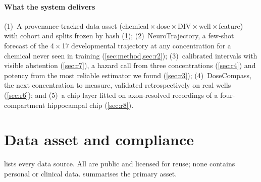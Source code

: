 \documentclass[11pt,a4paper]{article}
\newcommand{\NT}{NeuroTrajectory}
\newcommand{\DC}{DoseCompass}
\begin{document}
\paragraph{What the system delivers}
(1)~A provenance-tracked data asset (chemical\,\(\times\)\,dose\,\(\times\)\,DIV\,\(\times\)\,well\,\(\times\)\,feature)
with cohort and splits frozen by hash (\cref{sec:data}); (2)~\NT, a few-shot forecast of the 4\,\(\times\)\,17
developmental trajectory at any concentration for a chemical never seen in training (\cref{sec:method,sec:r2});
(3)~calibrated intervals with visible abstention (\cref{sec:r7}), a hazard call from three concentrations
(\cref{sec:r4}) and potency from the most reliable estimator we found (\cref{sec:r3}); (4)~\DC, the next
concentration to measure, validated retrospectively on real wells (\cref{sec:r6}); and (5)~a chip layer fitted on
axon-resolved recordings of a four-compartment hippocampal chip (\cref{sec:r8}).


\section{Data asset and compliance}\label{sec:data}

 lists every data source. All are public and licensed for reuse; none contains personal or
clinical data.  summarises the primary asset.
\end{document}
